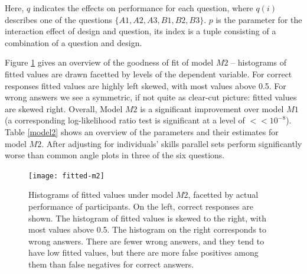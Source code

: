 Here, $q$ indicates the effects on performance for  each question, where $q(i)$ describes one of the questions $\{A1, A2, A3, B1, B2, B3\}$. $p$ is the parameter for the interaction effect of design and question, its index is a tuple consisting of a combination of a question and design. 

Figure \ref{fitted.m2} gives an overview of the goodness of fit of model $M2$ -- histograms of fitted values are drawn facetted by levels of the dependent variable. For correct responses fitted values are highly left skewed, with most values  above 0.5. For wrong answers we see a symmetric, if not quite as clear-cut picture: fitted values are skewed right. 
Overall, Model $M2$ is a significant improvement over model $M1$ (a corresponding log-likelihood ratio test is significant at a level of $<\!\!\!< 10^{-8}$).
Table \ref{model2} shows an overview of the  parameters and their estimates for model $M2$. After adjusting for individuals' skills parallel sets perform significantly worse than common angle plots in three of the six questions. 

\begin{figure}
\texttt{[image: fitted-m2]}
\caption{\label{fitted.m2} Histograms of fitted values under model $M2$, facetted by actual performance of participants. On the left, correct responses are shown. The histogram of fitted values is skewed to the right, with most values above 0.5. The histogram on the right corresponds to wrong answers. There are fewer wrong answers, and they tend to have low fitted values, but there are more false positives among them than false negatives for correct answers. }
\end{figure}

